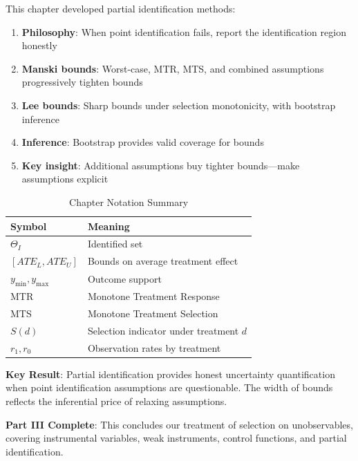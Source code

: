 This chapter developed partial identification methods:

\begin{enumerate}
    \item \textbf{Philosophy}: When point identification fails, report the identification region honestly

    \item \textbf{Manski bounds}: Worst-case, MTR, MTS, and combined assumptions progressively tighten bounds

    \item \textbf{Lee bounds}: Sharp bounds under selection monotonicity, with bootstrap inference

    \item \textbf{Inference}: Bootstrap provides valid coverage for bounds

    \item \textbf{Key insight}: Additional assumptions buy tighter bounds---make assumptions explicit
\end{enumerate}

\begin{table}[htbp]
\centering
\caption{Chapter Notation Summary}
\label{tab:bounds_notation}
\begin{tabular}{ll}
\toprule
Symbol & Meaning \\
\midrule
$\Theta_I$ & Identified set \\
$[ATE_L, ATE_U]$ & Bounds on average treatment effect \\
$y_{\min}, y_{\max}$ & Outcome support \\
MTR & Monotone Treatment Response \\
MTS & Monotone Treatment Selection \\
$S(d)$ & Selection indicator under treatment $d$ \\
$r_1, r_0$ & Observation rates by treatment \\
\bottomrule
\end{tabular}
\end{table}

\textbf{Key Result}: Partial identification provides honest uncertainty quantification when point identification assumptions are questionable. The width of bounds reflects the inferential price of relaxing assumptions.

\textbf{Part III Complete}: This concludes our treatment of selection on unobservables, covering instrumental variables, weak instruments, control functions, and partial identification.
